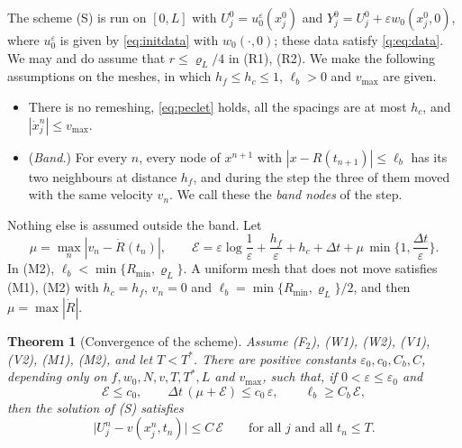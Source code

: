 \documentclass[11pt]{amsart}
\newtheorem{theorem}{Theorem}[section]
\theoremstyle{definition}
\theoremstyle{remark}
\newcommand{\ve}{\varepsilon}
\begin{document}
The scheme (S) is run on $[0,L]$ with $U^0_j=u_0^\ve(x^0_j)$ and
$Y^0_j=U^0_j+\ve w_0(x^0_j,0)$, where $u_0^\ve$ is given by \eqref{eq:initdata} with
$w_0(\cdot,0)$; these data satisfy \eqref{q:eq:data}. We may and do assume that
$r\le\varrho_L/4$ in (R1), (R2). We make the following
assumptions on the meshes, in which $h_f\le h_c\le1$, $\ell_b>0$ and $v_{\max}$ are given.
\begin{itemize}
\item[(M1)] There is no remeshing, \eqref{eq:peclet} holds, all the spacings are at most
$h_c$, and $|\dot x^n_j|\le v_{\max}$.
\item[(M2)] (\emph{Band.}) For every $n$, every node of $x^{n+1}$ with
$|x-R(t_{n+1})|\le\ell_b$ has its two neighbours at distance $h_f$, and during the step
the three of them moved with the same velocity $v_n$. We call these the \emph{band
nodes} of the step.
\end{itemize}
Nothing else is assumed outside the band. Let
\[
\mu=\max_n|v_n-\dot R(t_n)|,\qquad
\mathcal E=\ve\log\frac1\ve+\frac{h_f}\ve+h_c+\Delta t+\mu\,\min\Big\{1,\frac{\Delta t}\ve\Big\}.
\]
In (M2), $\ell_b<\min\{R_{\min},\varrho_L\}$. A uniform mesh that does not move satisfies
(M1), (M2) with $h_c=h_f$, $v_n=0$ and $\ell_b=\min\{R_{\min},\varrho_L\}/2$, and then
$\mu=\max|\dot R|$.

\begin{theorem}[Convergence of the scheme]\label{cv:thm:main}
Assume (F$_2$), (W1), (W2), (V1), (V2), (M1), (M2), and let $T<T^*$. There are positive
constants $\ve_0,c_0,C_b,C$, depending only on $f,w_0,N,v,T,T^*,L$ and $v_{\max}$, such that, if
$0<\ve\le\ve_0$ and
\begin{equation}\label{cv:eq:hyp}
\mathcal E\le c_0,\qquad \Delta t\,(\mu+\mathcal E)\le c_0\,\ve,\qquad \ell_b\ge C_b\,\mathcal E,
\end{equation}
then the solution of (S) satisfies
\[
\big|U^n_j-v(x^n_j,t_n)\big|\le C\,\mathcal E\qquad\text{for all }j\text{ and all }t_n\le T.
\]
\end{theorem}
\end{document}
